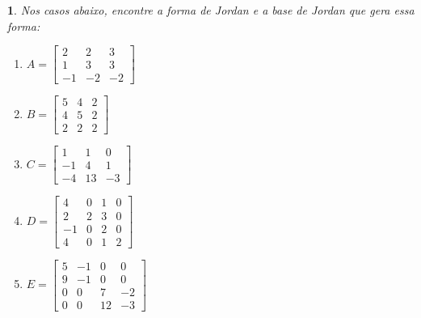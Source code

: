 \documentclass[12pt]{exam}
\newtheorem{exercicio}{}
\begin{document}
\begin{exercicio}
  Nos casos abaixo, encontre a forma de Jordan e a base de Jordan que gera essa forma:
  \begin{enumerate}[label=({\alph*})]
    \item $A = \begin{bmatrix}
      2 & 2 & 3\\
      1 & 3 & 3\\
      -1 & -2 & -2
    \end{bmatrix}$
    \item $B = \begin{bmatrix}
      5 & 4 & 2\\
      4 & 5 & 2\\
      2 & 2 & 2
    \end{bmatrix}$
    \item $C = \begin{bmatrix}
      1 & 1 & 0\\
      -1 & 4 & 1\\
      -4 & 13 & -3
    \end{bmatrix}$
    \item $D = \begin{bmatrix}
      4 & 0 & 1 & 0\\
      2 & 2 & 3 & 0\\
      -1 & 0 & 2 & 0\\
      4 & 0 & 1 & 2
    \end{bmatrix}$
    \item $E = \begin{bmatrix}
      5 & -1 & 0 & 0\\
      9 & -1 & 0 & 0\\
      0 & 0 & 7 & -2\\
      0 & 0 & 12 & -3
    \end{bmatrix}$
  \end{enumerate}
  \begin{solucao}
\end{solucao}
\end{exercicio}
\end{document}
